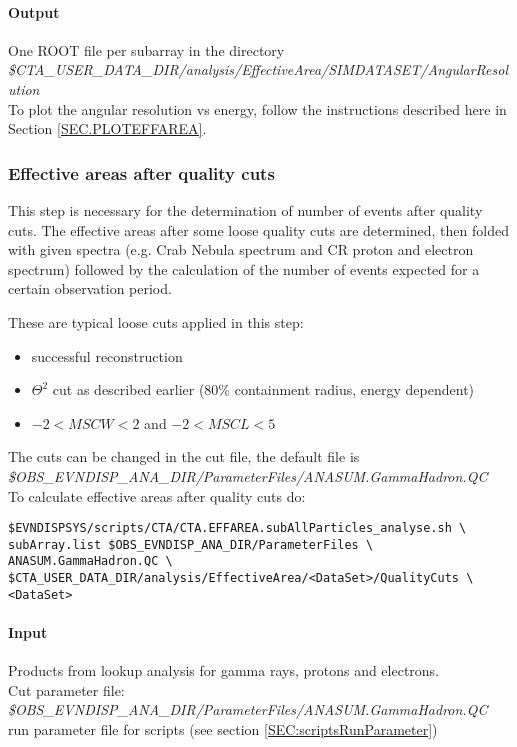 \documentclass[titlepage,a4paper,twoside,11pt]{report}
\begin{document}
\paragraph{Output}

One ROOT file per subarray in the directory  \\
{\it \$CTA\_USER\_DATA\_DIR/analysis/EffectiveArea/SIMDATASET/AngularResolution} \\
To plot the angular resolution vs energy, follow the instructions described here in Section \ref{SEC.PLOTEFFAREA}.

\subsubsection{Effective areas after quality cuts}

This step is necessary for the determination of number of events after quality cuts. 
The effective areas after some loose quality cuts are determined, then folded with given spectra (e.g. Crab Nebula spectrum and CR proton and electron spectrum) followed by the calculation of the number of events expected for a certain observation period.

These are typical loose cuts applied in this step:
\begin{itemize}
\item successful reconstruction
\item $\Theta^2$ cut as described earlier (80\% containment radius, energy dependent)
\item $-2<MSCW<2$ and $-2<MSCL<5$
\end{itemize}
The cuts can be changed in the cut file, the default file is\\
{\it \$OBS\_EVNDISP\_ANA\_DIR/ParameterFiles/ANASUM.GammaHadron.QC}\\

To calculate effective areas after quality cuts do:

\begin{lstlisting}
$EVNDISPSYS/scripts/CTA/CTA.EFFAREA.subAllParticles_analyse.sh \
subArray.list $OBS_EVNDISP_ANA_DIR/ParameterFiles \
ANASUM.GammaHadron.QC \
$CTA_USER_DATA_DIR/analysis/EffectiveArea/<DataSet>/QualityCuts \
<DataSet> 
\end{lstlisting}

\paragraph{Input} 
Products from lookup analysis for gamma rays, protons and electrons. \\
Cut parameter file: \\
{\it \$OBS\_EVNDISP\_ANA\_DIR/ParameterFiles/ANASUM.GammaHadron.QC}\\
run parameter file for scripts (see section \ref{SEC:scriptsRunParameter})
\end{document}
